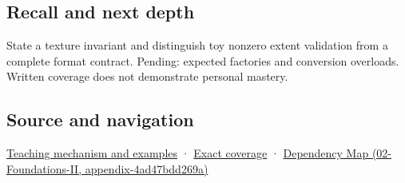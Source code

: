 \subsection{Recall and next depth}\label{recall-and-next-depth}

State a texture invariant and distinguish toy nonzero extent validation from a complete format contract. Pending: expected factories and conversion overloads. Written coverage does not demonstrate personal mastery.

\subsection{Source and navigation}\label{source-and-navigation}

\href{Continuous\%20Notes/Computing\%20Foundations\%20-\%20From\%20Bits\%20to\%20C++\%20and\%20Systems\%20APIs\#Construction\%20establishes\%20a\%20usable\%20state}{Teaching mechanism and examples} · \hyperref[appendix-fd090d982a15]{Exact coverage} · \href{}{Dependency Map (02-Foundations-II, appendix-4ad47bdd269a)}
